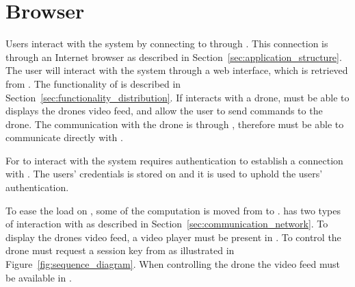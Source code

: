 \section{Browser}
\label{sec:design_client}
Users interact with the system by connecting to  through .
This connection is through an Internet browser as described in Section~\ref{sec:application_structure}.
The user will interact with the system through a web interface, which is retrieved from .
The functionality of  is described in Section~\ref{sec:functionality_distribution}.
If  interacts with a drone,  must be able to displays the drones video feed, and allow the user to send commands to the drone.
The communication with the drone is through , therefore  must be able to communicate directly with .

For  to interact with the system requires authentication to establish a connection with .
The users' credentials is stored on  and it is used to uphold the users' authentication.

To ease the load on , some of the computation is moved from  to .
 has two types of interaction with  as described in Section~\ref{sec:communication_network}.
To display the drones video feed, a video player must be present in .
To control the drone  must request a session key from  as illustrated in Figure~\ref{fig:sequence_diagram}.
When controlling the drone the video feed must be available in .



